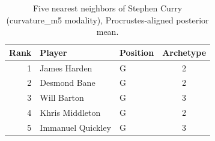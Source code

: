 \begin{table}[htbp]
  \centering\small
  \begin{tabular}{rllc}
    \toprule
    Rank & Player & Position & Archetype \\
    \midrule
    1 & James Harden & G & 2 \\
    2 & Desmond Bane & G & 2 \\
    3 & Will Barton & G & 3 \\
    4 & Khris Middleton & G & 2 \\
    5 & Immanuel Quickley & G & 3 \\
    \bottomrule
  \end{tabular}
  \caption{Five nearest neighbors of Stephen Curry (curvature_m5 modality), Procrustes-aligned posterior mean.}
  \label{tab:Stephen_Curry_neighbors_curvature_m5}
\end{table}

